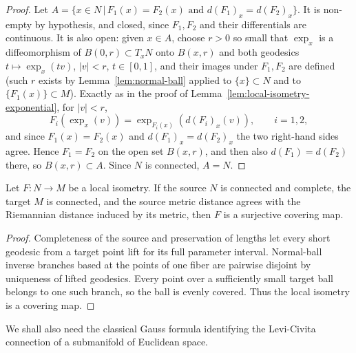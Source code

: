 \begin{proof}

\sketch
{}
Let $A=\{x\in N\,|\, F_1(x)=F_2(x)\text{ and }
d(F_1)_x=d(F_2)_x\}$. It is non-empty by hypothesis, and closed,
since $F_1,F_2$ and their differentials are continuous. It is also
open: given $x\in A$, choose $r>0$ so small that $\exp_x$ is a
diffeomorphism of $B(0,r)\subset T_xN$ onto $B(x,r)$ and both
geodesics $t\mapsto\exp_x(tv)$, $|v|<r$, $t\in[0,1]$, and their
images under $F_1,F_2$ are defined (such $r$ exists by
Lemma~\ref{lem:normal-ball} applied to $\{x\}\subset N$ and to
$\{F_1(x)\}\subset M$). Exactly as in the proof of
Lemma~\ref{lem:local-isometry-exponential}, for $|v|<r$,
$$F_i\left(\exp_x(v)\right)=\exp_{F_i(x)}\left(d(F_i)_x
(v)\right),\qquad i=1,2,$$
and since $F_1(x)=F_2(x)$ and $d(F_1)_x=d(F_2)_x$ the two right-hand
sides agree. Hence $F_1=F_2$ on the open set $B(x,r)$, and then also
$d(F_1)=d(F_2)$ there, so $B(x,r)\subset A$. Since $N$ is connected,
$A=N$.
\end{proof}

\begin{lemma}
\label{lem:local-isometry-covering}


Let $F\colon N\to M$ be a local isometry. If the source $N$ is connected
and complete, the target $M$ is connected, and the source metric distance
agrees with the Riemannian distance induced by its metric, then $F$ is a
surjective covering map.
\end{lemma}

\begin{proof}
\sketch
{}
Completeness of the source and preservation of lengths let every short geodesic from a target point lift for its full parameter interval. Normal-ball inverse branches based at the points of one fiber are pairwise disjoint by uniqueness of lifted geodesics. Every point over a sufficiently small target ball belongs to one such branch, so the ball is evenly covered. Thus the local isometry is a covering map.
\end{proof}

We shall also need the classical Gauss formula identifying the
Levi-Civita connection of a submanifold of Euclidean space.

